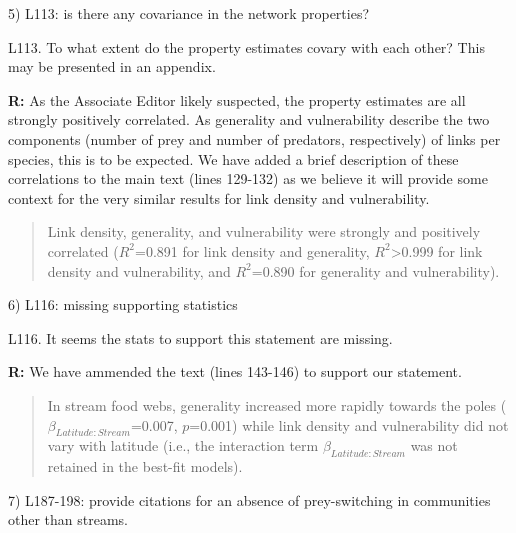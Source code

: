 \documentclass[12pt]{letter}
\newenvironment{refquote}{\bigskip \begin{it}}{\end{it}\smallskip}
\begin{document}
  5) L113: is there any covariance in the network properties?

  \begin{refquote}

    L113. To what extent do the property estimates covary with each other?
    This may be presented in an appendix.

  \end{refquote}


  \textbf{R:} As the Associate Editor likely suspected, the 
  property estimates are all strongly positively correlated. 
  As generality and vulnerability describe the two 
  components (number of prey and number of predators,
  respectively) of links per species, this is to be 
  expected. We have added a brief description of these 
  correlations to the main text (lines 129-132) as we 
  believe it will provide some context for the very similar 
  results for link density and vulnerability.

  \begin{quotation}

    Link density, generality, and vulnerability were strongly and positively
    correlated ($R^2$=0.891 for link density and generality,
    $R^2$\textgreater0.999 for link density and vulnerability, and $R^2$=0.890
    for generality and vulnerability).

  \end{quotation}


  6) L116: missing supporting statistics

  \begin{refquote}

    L116. It seems the stats to support this statement are missing.

  \end{refquote}
 

  \textbf{R:} We have ammended the text (lines 143-146) to support our statement.

  \begin{quotation}
    In stream food
    webs, generality increased more rapidly towards the poles
    ($\beta_{Latitude:Stream}$=0.007, $p$=0.001) while link density and
    vulnerability did not vary with latitude (i.e., the interaction term $\beta_{Latitude:Stream}$ was not retained in the best-fit models).
  \end{quotation}


  7) L187-198: provide citations for an absence of prey-switching in communities other than streams.
\end{document}
